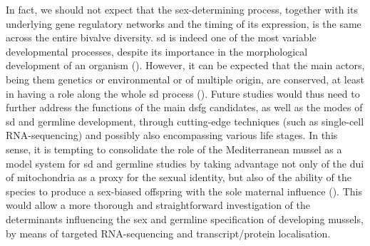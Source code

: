 In fact, we should not expect that the sex-determining process, together with its underlying gene regulatory networks and the timing of its expression, is the same across the entire bivalve diversity. \gls{sd} is indeed one of the most variable developmental processes, despite its importance in the morphological development of an organism (). However, it can be expected that the main actors, being them genetics or environmental or of multiple origin, are conserved, at least in having a role along the whole \gls{sd} process (). Future studies would thus need to further address the functions of the main \gls{dsfg} candidates, as well as the modes of \gls{sd} and germline development, through cutting-edge techniques (such as single-cell RNA-sequencing) and possibly also encompassing various life stages. In this sense, it is tempting to consolidate the role of the Mediterranean mussel as a model system for \gls{sd} and germline studies by taking advantage not only of the \gls{dui} of mitochondria as a proxy for the sexual identity, but also of the ability of the species to produce a sex-biased offspring with the sole maternal influence (). This would allow a more thorough and straightforward investigation of the determinants influencing the sex and germline specification of developing mussels, by means of targeted RNA-sequencing and transcript/protein localisation.

% 
